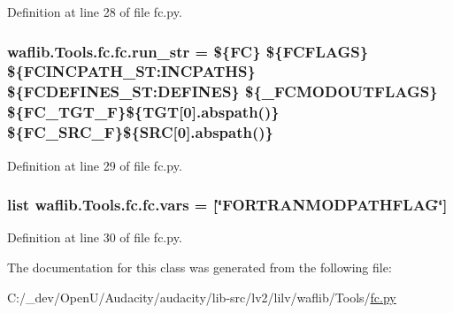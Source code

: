 Definition at line 28 of file fc.\+py.

\subsubsection[{\texorpdfstring{run\+\_\+str}{run_str}}]{ waflib.\+Tools.\+fc.\+fc.\+run\+\_\+str = \textquotesingle{}\$\{FC\} \$\{F\+C\+F\+L\+A\+GS\} \$\{F\+C\+I\+N\+C\+P\+A\+T\+H\+\_\+\+S\+T\+:\+I\+N\+C\+P\+A\+T\+HS\} \$\{F\+C\+D\+E\+F\+I\+N\+E\+S\+\_\+\+S\+T\+:\+D\+E\+F\+I\+N\+ES\} \$\{\+\_\+\+F\+C\+M\+O\+D\+O\+U\+T\+F\+L\+A\+GS\} \$\{F\+C\+\_\+\+T\+G\+T\+\_\+F\}\$\{T\+GT\mbox{[}0\mbox{]}.abspath()\} \$\{F\+C\+\_\+\+S\+R\+C\+\_\+F\}\$\{S\+RC\mbox{[}0\mbox{]}.abspath()\}\textquotesingle{}\hspace{0.3cm}{\ttfamily [static]}}\hypertarget{classwaflib_1_1_tools_1_1fc_1_1fc_af7f4ff0dcdc7c05d3d34c1b99c736f09}{}\label{classwaflib_1_1_tools_1_1fc_1_1fc_af7f4ff0dcdc7c05d3d34c1b99c736f09}


Definition at line 29 of file fc.\+py.

\subsubsection[{\texorpdfstring{vars}{vars}}]{\setlength{\rightskip}{0pt plus 5cm}list waflib.\+Tools.\+fc.\+fc.\+vars = \mbox{[}\char`\"{}F\+O\+R\+T\+R\+A\+N\+M\+O\+D\+P\+A\+T\+H\+F\+L\+AG\char`\"{}\mbox{]}\hspace{0.3cm}{\ttfamily [static]}}\hypertarget{classwaflib_1_1_tools_1_1fc_1_1fc_a0db5febe46e2052fbdd5ecef95049a2b}{}\label{classwaflib_1_1_tools_1_1fc_1_1fc_a0db5febe46e2052fbdd5ecef95049a2b}


Definition at line 30 of file fc.\+py.



The documentation for this class was generated from the following file\+:\begin{DoxyCompactItemize}
\item 
C\+:/\+\_\+dev/\+Open\+U/\+Audacity/audacity/lib-\/src/lv2/lilv/waflib/\+Tools/\hyperlink{lilv_2waflib_2_tools_2fc_8py}{fc.\+py}\end{DoxyCompactItemize}

